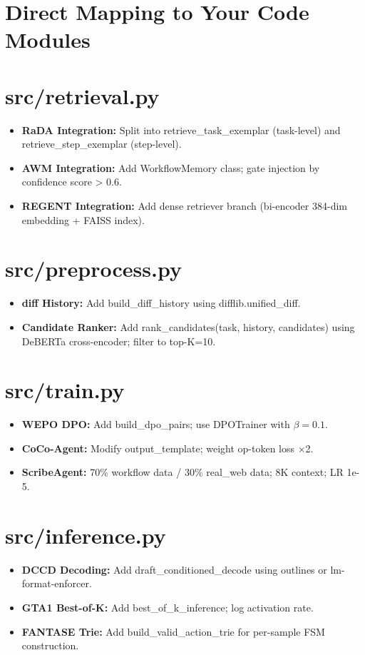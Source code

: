 \documentclass[pdflatex,sn-mathphys-num]{sn-jnl}
\theoremstyle{thmstyleone}
\theoremstyle{thmstyletwo}
\theoremstyle{thmstylethree}
\begin{document}
\section{Direct Mapping to Your Code Modules}

\section{src/retrieval.py}
\begin{itemize}
\item \textbf{RaDA Integration:} Split into retrieve\_task\_exemplar (task-level) and retrieve\_step\_exemplar (step-level).
\item \textbf{AWM Integration:} Add WorkflowMemory class; gate injection by confidence score > 0.6.
\item \textbf{REGENT Integration:} Add dense retriever branch (bi-encoder 384-dim embedding + FAISS index).
\end{itemize}

\section{src/preprocess.py}
\begin{itemize}
\item \textbf{diff History:} Add build\_diff\_history using difflib.unified\_diff.
\item \textbf{Candidate Ranker:} Add rank\_candidates(task, history, candidates) using DeBERTa cross-encoder; filter to top-K=10.
\end{itemize}

\section{src/train.py}
\begin{itemize}
\item \textbf{WEPO DPO:} Add build\_dpo\_pairs; use DPOTrainer with $\beta=0.1$.
\item \textbf{CoCo-Agent:} Modify output\_template; weight op-token loss $\times$2.
\item \textbf{ScribeAgent:} 70\% workflow data / 30\% real\_web data; 8K context; LR 1e-5.
\end{itemize}

\section{src/inference.py}
\begin{itemize}
\item \textbf{DCCD Decoding:} Add draft\_conditioned\_decode using outlines or lm-format-enforcer.
\item \textbf{GTA1 Best-of-K:} Add best\_of\_k\_inference; log activation rate.
\item \textbf{FANTASE Trie:} Add build\_valid\_action\_trie for per-sample FSM construction.
\end{itemize}
\end{document}
